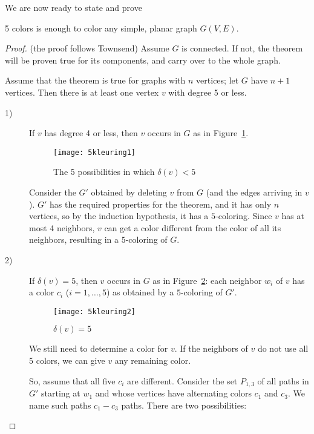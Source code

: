 We are now ready to state and prove

 \begin{theorem} 5 colors is enough to color any simple,
     planar graph $G(V,E)$.
\end{theorem} %
\begin{proof} (the proof follows Townsend)
Assume $G$ is connected.
If not, the theorem will be proven true for its components, and carry
over to the whole graph.
{Assume that the theorem is true for
graphs with $n$ vertices; let $G$ have $n+1$ vertices. Then there is
at least one vertex $v$ with degree 5 or less.
\begin{description}
\item[1)]
If $v$ has degree 4 or less, then $v$ occurs in $G$ as in
Figure~\ref{5kleuring1}.

\begin{figure}[ht]
	\centering
	\texttt{[image: 5kleuring1]}
	\caption{The 5 possibilities in which $\delta(v) < 5$ \label{5kleuring1}}
\end{figure}

Consider the $G'$ obtained by deleting $v$ from $G$ (and the edges
arriving in $v$). $G'$ has the required properties for the theorem,
and it has only $n$ vertices, so by the induction hypothesis, it has a
$5$-coloring. Since $v$ has at most 4 neighbors, $v$ can get a color
different from the color of all its neighbors, resulting in a
$5$-coloring of $G$.

\item[2)]
If $\delta(v) = 5$, then $v$ occurs in $G$ as in
Figure~\ref{5kleuring2}: each neighbor $w_{i}$ of $v$ has a color
$c_{i}$ ($i = 1,\ldots,5$) as obtained by a $5$-coloring of $G'$.

\begin{figure}[ht]
	\centering
	\texttt{[image: 5kleuring2]}
	\caption{$\delta(v) = 5$ \label{5kleuring2}}
\end{figure}

We still need to determine a color for $v$. If the neighbors of $v$ do
not use all 5 colors, we can give $v$ any remaining color.

So, assume that all five $c_{i}$ are different. Consider the set
$P_{1,3}$ of all paths in $G'$ starting at $w_{1}$ and whose vertices
have alternating colors $c_{1}$ and $c_{3}$. We name such paths
$c_{1}-c_{3}$ paths.  There are two possibilities:


\end{description}}
\end{proof}
